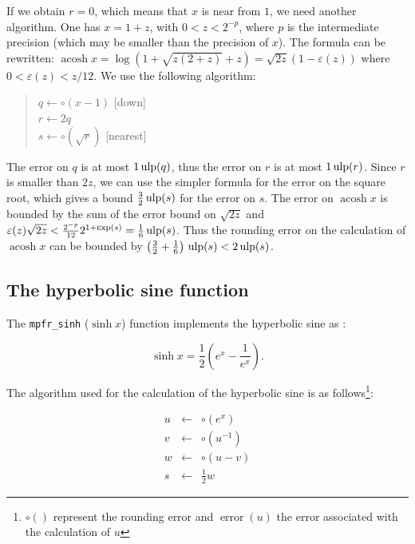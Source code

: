 \documentclass[12pt]{amsart}
\DeclareMathOperator{\acosh}{acosh}
\def\ulp{{\rm ulp}}
\def\Exp{{\rm \textsc exp}}
\DeclareMathOperator{\error}{error}
\begin{document}
If we obtain $r = 0$, which means that $x$ is near from $1$,
we need another algorithm.
One has $x = 1 + z$, with $0 < z < 2^{-p}$, where $p$ is the intermediate
precision (which may be smaller than the precision of $x$). The formula
can be rewritten:
$\acosh x = \log (1 + \sqrt{z(2+z)} + z) = \sqrt{2z} (1 - \varepsilon(z))$
where $0 < \varepsilon(z) < z / 12$.
We use the following algorithm:
\begin{quote}
$q \leftarrow \circ(x - 1)$ [down] \\
$r \leftarrow 2q$ \\
$s \leftarrow \circ(\sqrt{r})$ [nearest]
\end{quote}

The error on $q$ is at most $1\,\ulp(q)$, thus the error on $r$ is at most
$1\,\ulp(r)$. Since $r$ is smaller than $2z$, we can use the simpler formula
for the error on the square root, which gives a bound $\frac{3}{2}\,\ulp(s)$
for the error on $s$. The error on $\acosh x$ is bounded by the sum of the
error bound on $\sqrt{2z}$ and $\varepsilon(z) \sqrt{2z} <
\frac{2^{-p}}{12} 2^{1+\Exp(s)} = \frac{1}{6}\,\ulp(s)$.
Thus the rounding error on the calculation of $\acosh x$ can be bounded by
$\left(\frac{3}{2} + \frac{1}{6}\right)\,\ulp(s) < 2\,\ulp(s)$.

\subsection{The hyperbolic sine function}

The {\tt mpfr\_sinh} ($\sinh{x}$) function implements the hyperbolic
sine as :

\[\sinh x = \frac{1}{2} \left( e^{x} - \frac{1}{e^x} \right).\]

The algorithm used for the calculation of the hyperbolic sine is as follows\footnote{$\circ()$ represent the rounding error and $\error(u)$ the
  error associated with the calculation of $u$}:

\begin{eqnarray}\nonumber
u&\leftarrow&\circ(e^x)\\\nonumber
v&\leftarrow&\circ({u}^{-1})\\\nonumber
w&\leftarrow&\circ(u-v)\\\nonumber
s&\leftarrow&\frac{1}{2} w
\end{eqnarray}
\end{document}
